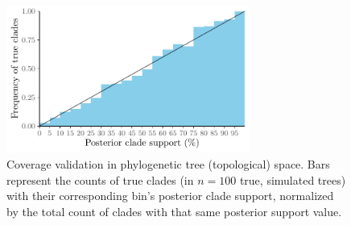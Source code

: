 \documentclass[oneside]{article}
\begin{document}
\begin{figure}[!ht]
  \centering
   \includegraphics[width=8cm]{../figures/clade_coverage.pdf}
   \caption{Coverage validation in phylogenetic tree (topological) space. Bars represent the counts of true clades (in $n=100$ true, simulated trees) with their corresponding bin's posterior clade support, normalized by the total count of clades with that same posterior support value.}
   \label{supfig:clade_covg}
\end{figure}
 
\clearpage


\end{document}

